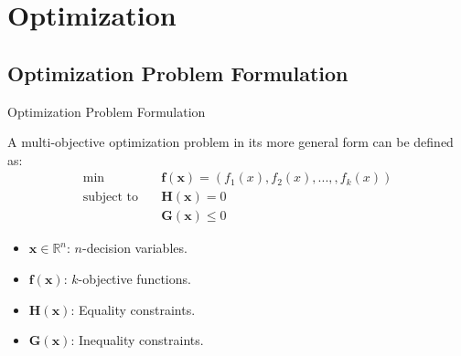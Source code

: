 
\section{Optimization}


\begin{frame}{}
    \tableofcontents[currentsection]
\end{frame}

\subsection{Optimization Problem Formulation}

\begin{frame}{Optimization Problem Formulation}

A multi-objective optimization problem in its more general form can be defined as:
\begin{equation}\label{optiprob}
    \begin{aligned}
        \text{min} \quad & \mathbf{f}(\mathbf{x})=(f_1(x),f_2(x),...,,f_k(x)) \\
        \text{subject to} \quad & \mathbf{H(x)} = 0 \\
        & \mathbf{G(x)} \leq 0
    \end{aligned}
\end{equation}
\begin{itemize}
    \item $\mathbf{x} \in \mathbb{R}^n$: $n$-decision variables.
    \item $\mathbf{f}(\mathbf{x})$: $k$-objective functions.
    \item $\mathbf{H(x)}$: Equality constraints.
    \item $\mathbf{G(x)}$: Inequality constraints.
\end{itemize}


\end{frame}

